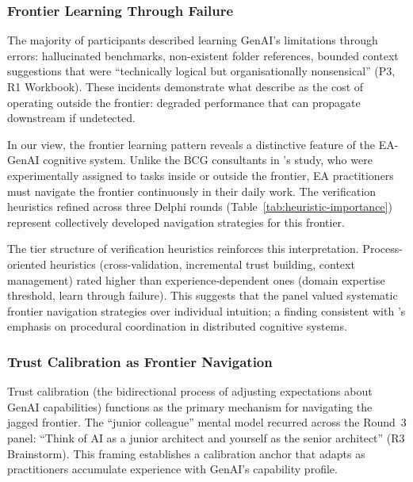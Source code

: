 \subsubsection{Frontier Learning Through Failure}

The majority of participants described learning GenAI's limitations through
errors: hallucinated benchmarks, non-existent folder references, bounded
context suggestions that were ``technically logical but organisationally
nonsensical'' (P3, R1 Workbook). These incidents demonstrate what
\textcite{dellacqua_navigating_2023} describe as the cost of operating outside
the frontier: degraded performance that can propagate downstream if
undetected.

In our view, the frontier learning pattern reveals a distinctive feature of the
EA-GenAI cognitive system. Unlike the BCG consultants in
\textcite{dellacqua_navigating_2023}'s study, who were experimentally assigned
to tasks inside or outside the frontier, EA practitioners must navigate the
frontier continuously in their daily work. The verification heuristics refined
across three Delphi rounds (Table~\ref{tab:heuristic-importance}) represent
collectively developed navigation strategies for this frontier.

The tier structure of verification heuristics reinforces this interpretation.
Process-oriented heuristics (cross-validation, incremental trust building,
context management) rated higher than experience-dependent ones (domain
expertise threshold, learn through failure). This suggests that the panel
valued systematic frontier navigation strategies over individual intuition; a
finding consistent with \textcite{hutchins_cognition_1995}'s emphasis on
procedural coordination in distributed cognitive systems.

\subsubsection{Trust Calibration as Frontier Navigation}

Trust calibration (the bidirectional process of adjusting expectations about
GenAI capabilities) functions as the primary mechanism for navigating the
jagged frontier. The ``junior colleague'' mental model recurred across the
Round~3 panel: ``Think of AI as a junior architect and yourself as the senior
architect'' (R3 Brainstorm). This framing establishes a calibration anchor that
adapts as practitioners accumulate experience with GenAI's capability profile.

